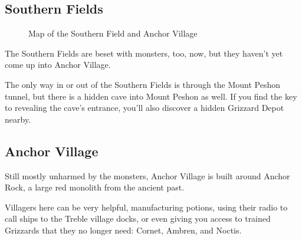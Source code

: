 \documentclass[10pt,twocolumn]{memoir}
\begin{document}
\subsection{Southern Fields}

\begin{figure}[ht]
  \begin{center}
  \end{center}
  \caption{Map of the Southern Field and Anchor Village}
\end{figure}

The Southern Fields are beset with monsters, too, now, but they haven't yet come
up into Anchor Village.

The  only  way  in  or  out  of   the  Southern  Fields  is  through  the  Mount
Peshon tunnel, but there is a hidden cave into Mount Peshon as well. If you find
the key to revealing the cave's entrance, you'll also discover a hidden Grizzard
Depot nearby.

\subsection{Anchor Village}

Still mostly  unharmed by the  monsters, Anchor  Village is built  around Anchor
Rock, a large red monolith from the ancient past.

Villagers here can be very helpful,  manufacturing potions, using their radio to
call ships  to the Treble  village docks, or even  giving you access  to trained
Grizzards that they no longer need: Cornet, Ambren, and Noctis.
\end{document}
